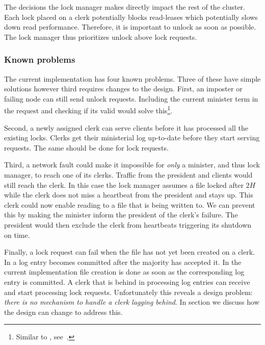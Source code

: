 The decisions the lock manager makes directly impact the rest of the cluster. Each lock placed on a clerk potentially blocks read-leases which potentially slows down read performance. Therefore, it is important to unlock as soon as possible. The lock manager thus prioritizes unlock above lock requests.
%
\subsubsection*{Known problems}
The current implementation has four known problems. Three of these have simple solutions however third requires changes to the design. First, an imposter or failing node can still send unlock requests. Including the current minister term in the request and checking if its valid would solve this\footnote{Similar to \graft{}, see~.}. 

Second, a newly assigned clerk can serve clients before it has processed all the existing locks. Clerks get their ministerial \raft{} log up-to-date before they start serving requests. The same should be done for lock requests. 

Third, a network fault could make it impossible for \textit{only} a minister, and thus lock manager, to reach one of its clerks. Traffic from the president and clients would still reach the clerk. In this case the lock manager assumes a file locked after $2H$ while the clerk does not miss a heartbeat from the president and stays up. This clerk could now enable reading to a file that is being written to. We can prevent this by making the minister inform the president of the clerk's failure. The president would then exclude the clerk from heartbeats triggering its shutdown on time. 

Finally, a lock request can fail when the file has not yet been created on a clerk. In \raft{} a log entry becomes committed after the majority has accepted it. In the current implementation file creation is done as soon as the corresponding log entry is committed. A clerk that is behind in processing log entries can receive and start processing lock requests. Unfortunately this reveals a design problem: \textit{there is no mechanism to handle a clerk lagging behind}. In section  we discuss how the design can change to address this.
